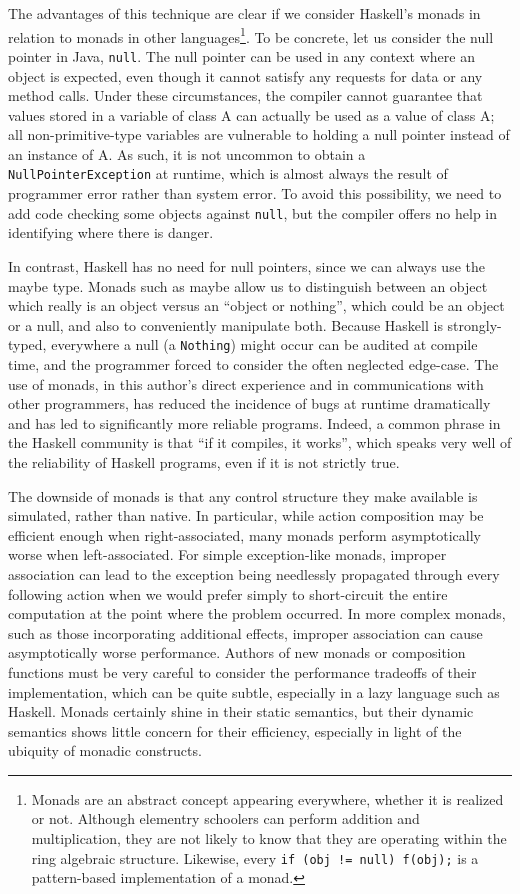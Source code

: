 \documentclass[11pt]{article}
\begin{document}
The advantages of this technique are clear if we consider Haskell's monads in relation to monads in other languages\footnote{Monads are an abstract concept appearing everywhere, whether it is realized or not. Although elementry schoolers can perform addition and multiplication, they are not likely to know that they are operating within the ring algebraic structure. Likewise, every \texttt{if (obj != null) f(obj);} is a pattern-based implementation of a monad.}.
To be concrete, let us consider the null pointer in Java, \texttt{null}.
The null pointer can be used in any context where an object is expected, even though it cannot satisfy any requests for data or any method calls.
Under these circumstances, the compiler cannot guarantee that values stored in a variable of class A can actually be used as a value of class A; all non-primitive-type variables are vulnerable to holding a null pointer instead of an instance of A.
As such, it is not uncommon to obtain a \texttt{NullPointerException} at runtime, which is almost always the result of programmer error rather than system error.
To avoid this possibility, we need to add code checking some objects against \texttt{null}, but the compiler offers no help in identifying where there is danger.

In contrast, Haskell has no need for null pointers, since we can always use the maybe type.
Monads such as maybe allow us to distinguish between an object which really is an object versus an ``object or nothing'', which could be an object or a null, and also to conveniently manipulate both.
Because Haskell is strongly-typed, everywhere a null (a \texttt{Nothing}) might occur can be audited at compile time, and the programmer forced to consider the often neglected edge-case.
The use of monads, in this author's direct experience and in communications with other programmers, has reduced the incidence of bugs at runtime dramatically and has led to significantly more reliable programs.
Indeed, a common phrase in the Haskell community is that ``if it compiles, it works'', which speaks very well of the reliability of Haskell programs, even if it is not strictly true.


The downside of monads is that any control structure they make available is simulated, rather than native.
In particular, while action composition may be efficient enough when right-associated, many monads perform asymptotically worse when left-associated.\cite{ReflectionWithoutRemorse}
For simple exception-like monads, improper association can lead to the exception being needlessly propagated through every following action when we would prefer simply to short-circuit the entire computation at the point where the problem occurred.
In more complex monads, such as those incorporating additional effects, improper association can cause asymptotically worse performance.
Authors of new monads or composition functions must be very careful to consider the performance tradeoffs of their implementation, which can be quite subtle, especially in a lazy language such as Haskell.
Monads certainly shine in their static semantics, but their dynamic semantics shows little concern for their efficiency, especially in light of the ubiquity of monadic constructs.
\end{document}
